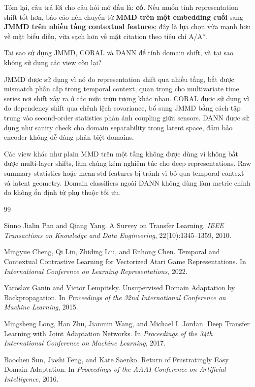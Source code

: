 \documentclass[a4paper]{article}
\begin{document}
Tóm lại, câu trả lời cho câu hỏi mở đầu là: \textbf{có}. Nếu muốn tính representation shift tốt hơn, báo cáo nên chuyển từ \textbf{MMD trên một embedding cuối} sang \textbf{JMMD trên nhiều tầng contextual features}; đây là lựa chọn vừa mạnh hơn về mặt biểu diễn, vừa sạch hơn về mặt citation theo tiêu chí A/A*.

Tại sao sử dụng JMMD, CORAL và DANN để tính domain shift, và tại sao không sử dụng các view còn lại?

JMMD được sử dụng vì nó đo representation shift qua nhiều tầng, bắt được mismatch phân cấp trong temporal context, quan trọng cho multivariate time series nơi shift xảy ra ở các mức trừu tượng khác nhau. CORAL được sử dụng vì đo dependency shift qua chênh lệch covariance, bổ sung JMMD bằng cách tập trung vào second-order statistics phản ánh coupling giữa sensors. DANN được sử dụng như sanity check cho domain separability trong latent space, đảm bảo encoder không dễ dàng phân biệt domains.

Các view khác như plain MMD trên một tầng không được dùng vì không bắt được multi-layer shifts, làm chúng kém nghiêm túc cho deep representations. Raw summary statistics hoặc mean-std features bị tránh vì bỏ qua temporal context và latent geometry. Domain classifiers ngoài DANN không dùng làm metric chính do không ổn định từ phụ thuộc tối ưu.

\begin{thebibliography}{99}

Sinno Jialin Pan and Qiang Yang.
\newblock A Survey on Transfer Learning.
\newblock \emph{IEEE Transactions on Knowledge and Data Engineering}, 22(10):1345--1359, 2010.

Mingyue Cheng, Qi Liu, Zhiding Liu, and Enhong Chen.
\newblock Temporal and Contextual Contrastive Learning for Vectorized Atari Game Representations.
\newblock In \emph{International Conference on Learning Representations}, 2022.

Yaroslav Ganin and Victor Lempitsky.
\newblock Unsupervised Domain Adaptation by Backpropagation.
\newblock In \emph{Proceedings of the 32nd International Conference on Machine Learning}, 2015.

Mingsheng Long, Han Zhu, Jianmin Wang, and Michael I. Jordan.
\newblock Deep Transfer Learning with Joint Adaptation Networks.
\newblock In \emph{Proceedings of the 34th International Conference on Machine Learning}, 2017.

Baochen Sun, Jiashi Feng, and Kate Saenko.
\newblock Return of Frustratingly Easy Domain Adaptation.
\newblock In \emph{Proceedings of the AAAI Conference on Artificial Intelligence}, 2016.

\end{thebibliography}
\end{document}
